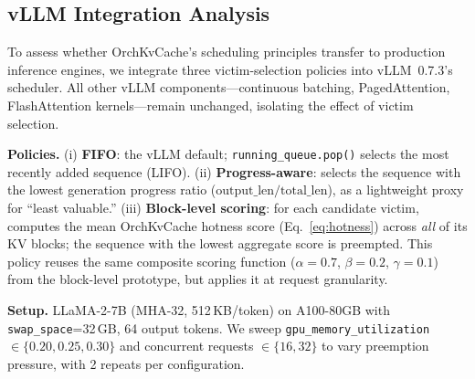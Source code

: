 \documentclass[conference]{IEEEtran}
\begin{document}
\subsection{vLLM Integration Analysis}
\label{sec:vllm-integration}

To assess whether OrchKvCache's scheduling principles transfer to production inference engines, we integrate three victim-selection policies into vLLM~0.7.3's scheduler. All other vLLM components---continuous batching, PagedAttention, FlashAttention kernels---remain unchanged, isolating the effect of victim selection.

\textbf{Policies.} (i) \textbf{FIFO}: the vLLM default; \texttt{running\_queue.pop()} selects the most recently added sequence (LIFO). (ii) \textbf{Progress-aware}: selects the sequence with the lowest generation progress ratio ($\text{output\_len} / \text{total\_len}$), as a lightweight proxy for ``least valuable.'' (iii) \textbf{Block-level scoring}: for each candidate victim, computes the mean OrchKvCache hotness score (Eq.~\ref{eq:hotness}) across \emph{all} of its KV blocks; the sequence with the lowest aggregate score is preempted. This policy reuses the same composite scoring function ($\alpha{=}0.7$, $\beta{=}0.2$, $\gamma{=}0.1$) from the block-level prototype, but applies it at request granularity.

\textbf{Setup.} LLaMA-2-7B (MHA-32, 512\,KB/token) on A100-80GB with \texttt{swap\_space}=32\,GB, 64 output tokens. We sweep \texttt{gpu\_memory\_utilization} $\in \{0.20, 0.25, 0.30\}$ and concurrent requests $\in \{16, 32\}$ to vary preemption pressure, with 2 repeats per configuration.
\end{document}
